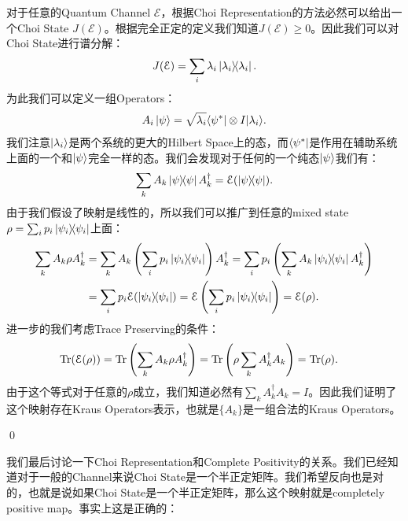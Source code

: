 对于任意的Quantum Channel $ \mathcal{E}$，根据Choi Representation的方法必然可以给出一个Choi State $ J(\mathcal{E}) $。根据完全正定的定义我们知道$ J(\mathcal{E}) \geq0 $。因此我们可以对Choi State进行谱分解：
\begin{align}
  J(\mathcal{E}) = \sum_i \lambda_i \left| \lambda_i \middle\rangle\!\middle\langle \lambda_i \right|.
\end{align}
为此我们可以定义一组Operators：
\begin{align}
  A_i \left| \psi \right\rangle = \sqrt{\lambda_i} \langle \psi^* |\otimes I | \lambda_i \rangle.
\end{align}
我们注意$ \left| \lambda_i \right\rangle $是两个系统的更大的Hilbert Space上的态，而$ \left\langle \psi^* \right| $是作用在辅助系统上面的一个和$ \left| \psi \right\rangle $完全一样的态。我们会发现对于任何的一个纯态$ \left| \psi \right\rangle $我们有：
\begin{align}
  \sum_k A_k \left| \psi \middle\rangle\!\middle\langle \psi \right| A_k^\dagger = \mathcal{E}(\left| \psi \middle\rangle\!\middle\langle \psi \right|).
\end{align}
由于我们假设了映射是线性的，所以我们可以推广到任意的mixed state $ \rho = \sum_i p_i \left| \psi_i \middle\rangle\!\middle\langle \psi_i \right| $上面：
\begin{align}
  \sum_k A_k \rho A_k^\dagger &= \sum_k A_k \left(\sum_i p_i \left| \psi_i \middle\rangle\!\middle\langle \psi_i \right|\right) A_k^\dagger = \sum_i p_i \left(\sum_k A_k \left| \psi_i \middle\rangle\!\middle\langle \psi_i \right| A_k^\dagger\right) \\&= \sum_i p_i \mathcal{E}(\left| \psi_i \middle\rangle\!\middle\langle \psi_i \right|) = \mathcal{E}\left(\sum_i p_i \left| \psi_i \middle\rangle\!\middle\langle \psi_i \right|\right) = \mathcal{E}(\rho).
\end{align}
进一步的我们考虑Trace Preserving的条件：
\begin{align}
  \operatorname{Tr}(\mathcal{E}(\rho)) &= \operatorname{Tr}\left(\sum_k A_k \rho A_k^\dagger\right) = \operatorname{Tr}\left(\rho \sum_k A_k^\dagger A_k\right) = \operatorname{Tr}(\rho).
\end{align}
由于这个等式对于任意的$ \rho $成立，我们知道必然有$ \sum_k A_k^\dagger A_k = I $。因此我们证明了这个映射存在Kraus Operators表示，也就是$ \{A_k\} $是一组合法的Kraus Operators。

\qed 


\bigskip
{}

我们最后讨论一下Choi Representation和Complete Positivity的关系。我们已经知道对于一般的Channel来说Choi State是一个半正定矩阵。我们希望反向也是对的，也就是说如果Choi State是一个半正定矩阵，那么这个映射就是completely positive map。事实上这是正确的：

